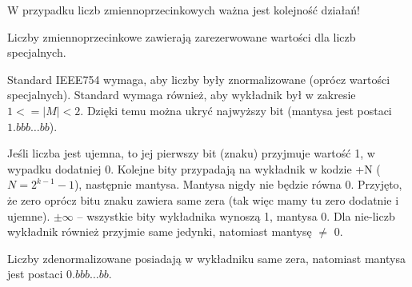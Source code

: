 W przypadku liczb zmiennoprzecinkowych ważna jest kolejność działań!

Liczby zmiennoprzecinkowe zawierają zarezerwowane wartości dla liczb specjalnych.

Standard IEEE754 wymaga, aby liczby były znormalizowane (oprócz wartości specjalnych). Standard wymaga również, aby wykładnik był w zakresie $1 <= |M| < 2$. Dzięki temu można ukryć najwyższy bit (mantysa jest postaci $1.bbb\ldots bb$).

Jeśli liczba jest ujemna, to jej pierwszy bit (znaku) przyjmuje wartość 1, w wypadku dodatniej 0. Kolejne bity przypadają na wykładnik w kodzie +N ($N = 2^{k-1}-1$), następnie mantysa. Mantysa nigdy nie będzie równa 0. Przyjęto, że zero oprócz bitu znaku zawiera same zera (tak więc mamy tu zero dodatnie i ujemne). $\pm\infty$ -- wszystkie bity wykładnika wynoszą 1, mantysa 0. Dla nie-liczb wykładnik również przyjmie same jedynki, natomiast mantysę $\ne$ 0.

Liczby zdenormalizowane posiadają w wykładniku same zera, natomiast mantysa jest postaci $0.bbb\ldots bb$.

